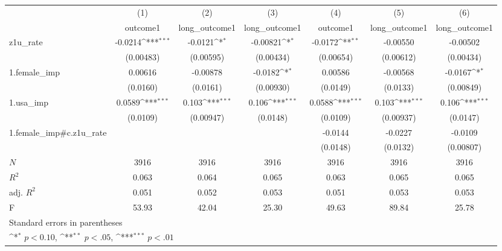 {
\def\sym#1{\ifmmode^{#1}\else\(^{#1}\)\fi}
\begin{tabular}{l*{6}{c}}
\hline\hline
            &\multicolumn{1}{c}{(1)}&\multicolumn{1}{c}{(2)}&\multicolumn{1}{c}{(3)}&\multicolumn{1}{c}{(4)}&\multicolumn{1}{c}{(5)}&\multicolumn{1}{c}{(6)}\\
            &\multicolumn{1}{c}{outcome1}&\multicolumn{1}{c}{long\_outcome1}&\multicolumn{1}{c}{long\_outcome1}&\multicolumn{1}{c}{outcome1}&\multicolumn{1}{c}{long\_outcome1}&\multicolumn{1}{c}{long\_outcome1}\\
\hline
z1u\_rate    &     -0.0214\sym{***}&     -0.0121\sym{*}  &    -0.00821\sym{*}  &     -0.0172\sym{**} &    -0.00550         &    -0.00502         \\
            &   (0.00483)         &   (0.00595)         &   (0.00434)         &   (0.00654)         &   (0.00612)         &   (0.00434)         \\
[1em]
1.female\_imp&     0.00616         &    -0.00878         &     -0.0182\sym{*}  &     0.00586         &    -0.00568         &     -0.0167\sym{*}  \\
            &    (0.0160)         &    (0.0161)         &   (0.00930)         &    (0.0149)         &    (0.0133)         &   (0.00849)         \\
[1em]
1.usa\_imp   &      0.0589\sym{***}&       0.103\sym{***}&       0.106\sym{***}&      0.0588\sym{***}&       0.103\sym{***}&       0.106\sym{***}\\
            &    (0.0109)         &   (0.00947)         &    (0.0148)         &    (0.0109)         &   (0.00937)         &    (0.0147)         \\
[1em]
1.female\_imp#c.z1u\_rate&                     &                     &                     &     -0.0144         &     -0.0227         &     -0.0109         \\
            &                     &                     &                     &    (0.0148)         &    (0.0132)         &   (0.00807)         \\
\hline
\(N\)       &        3916         &        3916         &        3916         &        3916         &        3916         &        3916         \\
\(R^{2}\)   &       0.063         &       0.064         &       0.065         &       0.063         &       0.065         &       0.065         \\
adj. \(R^{2}\)&       0.051         &       0.052         &       0.053         &       0.051         &       0.053         &       0.053         \\
F           &       53.93         &       42.04         &       25.30         &       49.63         &       89.84         &       25.78         \\
\hline\hline
\multicolumn{7}{l}{\footnotesize Standard errors in parentheses}\\
\multicolumn{7}{l}{\footnotesize \sym{*} \(p<0.10\), \sym{**} \(p<.05\), \sym{***} \(p<.01\)}\\
\end{tabular}
}
